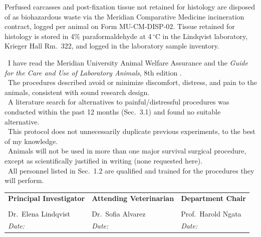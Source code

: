 Perfused carcasses and post-fixation tissue not retained for histology are disposed of as
biohazardous waste via the Meridian Comparative Medicine incineration contract, logged per
animal on Form MU-CM-DISP-02. Tissue retained for histology is stored in 4\% paraformaldehyde
at 4\,$^{\circ}$C in the Lindqvist laboratory, Krieger Hall Rm.\ 322, and logged in the
laboratory sample inventory.

\vspace{10pt}

\begin{tcolorbox}[narrbox={Certifications (all required)}]
\small
\ChkY\ I have read the Meridian University Animal Welfare Assurance and the \textit{Guide for
the Care and Use of Laboratory Animals}, 8th edition \cite{nrc2011guide}.\\[3pt]
\ChkY\ The procedures described avoid or minimize discomfort, distress, and pain to the
animals, consistent with sound research design.\\[3pt]
\ChkY\ A literature search for alternatives to painful/distressful procedures was conducted
within the past 12 months (Sec.\ 3.1) and found no suitable alternative.\\[3pt]
\ChkY\ This protocol does not unnecessarily duplicate previous experiments, to the best of
my knowledge.\\[3pt]
\ChkY\ Animals will not be used in more than one major survival surgical procedure, except as
scientifically justified in writing (none requested here).\\[3pt]
\ChkY\ All personnel listed in Sec.\ 1.2 are qualified and trained for the procedures they
will perform.
\end{tcolorbox}

\vspace{10pt}

\noindent
\begin{tabularx}{\linewidth}{@{} X X X @{}}
\textbf{Principal Investigator} & \textbf{Attending Veterinarian} & \textbf{Department Chair} \\[18pt]
\hrulefill & \hrulefill & \hrulefill \\[4pt]
Dr.\ Elena Lindqvist & Dr.\ Sofia Alvarez & Prof.\ Harold Ngata \\[2pt]
\textit{\footnotesize Date:}\,\underline{\hspace{24mm}} &
\textit{\footnotesize Date:}\,\underline{\hspace{24mm}} &
\textit{\footnotesize Date:}\,\underline{\hspace{24mm}} \\
\end{tabularx}

